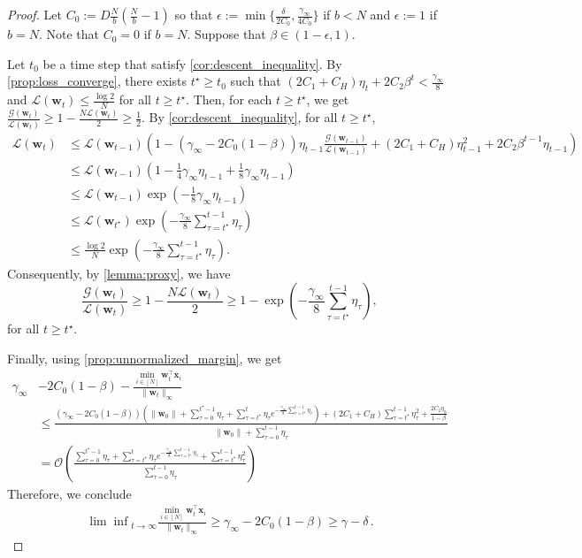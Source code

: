 \documentclass{article} %
\theoremstyle{plain}
\theoremstyle{definition}
\theoremstyle{remark}
\def\gG{{\mathcal{G}}}
\newcommand{\Ls}{\mathcal{L}}
\def\bx{{\mathbf x}}
\def\bw{{\mathbf w}}
\begin{document}
\Signum*
\begin{proof}
    Let $C_0:=D\tfrac Nb (\tfrac Nb-1)$ so that $\epsilon:=\min\{\frac{\delta}{2C_0}, \tfrac{\gamma_\infty}{4C_0}\}$ if $b<N$ and $\epsilon:=1$ if $b=N$. Note that $C_0=0$ if $b=N$. Suppose that $\beta\in (1-\epsilon, 1)$. 
    
    Let $t_0$ be a time step that satisfy \cref{cor:descent_inequality}. By \cref{prop:loss_converge}, there exists $t^\star\geq t_0$ such that $(2C_1+C_H)\eta_t + 2C_2\beta^t < \frac{\gamma_\infty}{8}$ and $\Ls (\bw_t) \leq \frac{\log 2}{N}$ for all $t\geq t^\star$. Then, for each $t\geq t^\star$, we get $\frac{\gG(\bw_t)}{\Ls (\bw_t)} \geq  1 - \frac{N\Ls(\bw_t)}{2} \geq \frac{1}{2}$. By \cref{cor:descent_inequality}, for all $t\geq t^\star$,
    \begin{align*}
        \Ls(\bw_t) &\leq \Ls(\bw_{t-1}) \left( 1- (\gamma_\infty - 2C_0(1-\beta)) \eta_{t-1} \frac{\gG(\bw_{t-1})}{\Ls(\bw_{t-1})} + (2C_1+C_H)\eta_{t-1}^2 + 2C_2 \beta^{t-1} \eta_{t-1}\right) \\
        &\leq \Ls(\bw_{t-1}) \left( 1- \frac14\gamma_\infty \eta_{t-1}  +  \frac18\gamma_\infty \eta_{t-1} \right) \\
        &\leq \Ls(\bw_{t-1}) \exp \left(-\frac{1}{8}\gamma_\infty\eta_{t-1}\right) \\
        &\leq \Ls(\bw_{t^\star}) \exp \left(-\frac{\gamma_\infty}{8} \sum_{\tau=t^\star}^{t-1} \eta_\tau\right) \\
        &\leq \frac{\log 2}{N} \exp \left(-\frac{\gamma_\infty}{8} \sum_{\tau=t^\star}^{t-1} \eta_\tau\right).
    \end{align*}
    Consequently, by \cref{lemma:proxy}, we have
    \[
    \frac{\gG(\bw_t)}{\Ls(\bw_t)} \geq 1 - \frac{N\Ls(\bw_t)}{2} \geq 1 -  \exp \left(-\frac{\gamma_\infty}{8} \sum_{\tau=t^\star}^{t-1} \eta_\tau\right),
    \]
    for all $t\geq t^\star$. 

    Finally, using \cref{prop:unnormalized_margin}, we get
    \begin{align*}
        \gamma_\infty &- 2C_0(1-\beta) - \frac{\min_{i\in [N]}\bw_t^\top \bx_i}{\|\bw_t\|_\infty} \\
        &\leq \frac{(\gamma_\infty - 2C_0(1-\beta))\left(\|\bw_0\| + \sum_{\tau = 0}^{t^\star-1}\eta_{\tau} + \sum_{\tau=t^\star}^t \eta_\tau e^{-\frac{\gamma_\infty}{8} \sum_{\tau=t^\star}^{t-1} \eta_\tau}\right) + (2C_1+C_H)\sum_{\tau=t^\star}^{t-1} \eta_\tau^2 + \frac{2C_2\eta_0}{1-\beta}}{\|\bw_0\| + \sum_{\tau = 0}^{t-1}\eta_{\tau}} \\
        &= \mathcal O \left( \frac{\sum_{\tau = 0}^{t^\star-1}\eta_{\tau} + \sum_{\tau=t^\star}^t \eta_\tau e^{-\frac{\gamma_\infty}{8} \sum_{\tau=t^\star}^{t-1} \eta_\tau}+\sum_{\tau=t^\star}^{t-1} \eta_\tau^2}{ \sum_{\tau = 0}^{t-1}\eta_{\tau}} \right)
    \end{align*}
    Therefore, we conclude
    \begin{align*}
        {\lim\inf}_{t\to\infty} \frac{\min_{i\in [N]} \bw_t^\top \bx_i}{\|\bw_t\|_\infty} \ge \gamma_\infty - 2C_0(1-\beta) \geq \gamma - \delta\,.
    \end{align*}
\end{proof}
\end{document}
